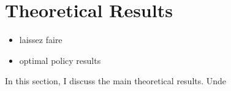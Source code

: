 \section{Theoretical Results}\label{sec:theory}
\begin{itemize}
	\item laissez faire
	\item optimal policy results
\end{itemize}

In this section, I discuss the main theoretical results. 
Unde